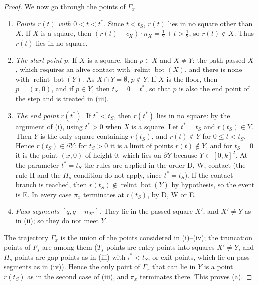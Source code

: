 \documentclass[11pt]{amsart}
\newcommand{\relint}{\operatorname{relint}}
\newcommand{\Bot}{\operatorname{bot}}
\newcommand{\Fs}{F_{s}}
\theoremstyle{definition}
\theoremstyle{remark}
\numberwithin{equation}{section}
\begin{document}
\begin{proof}
We now go through the points of $\Gamma_x$.
\begin{enumerate}[label=(\roman*)]
\item \emph{Points $r(t)$ with $0<t<t^*$.} Since $t<t_S$, $r(t)$ lies in no square other than $X$. If $X$ is a square, then $(r(t)-c_X)\cdot n_X=\frac12+t>\frac12$, so $r(t)\notin X$. Thus $r(t)$ lies in no square.
\item \emph{The start point $p$.} If $X$ is a square, then $p\in X$ and $X\ne Y$: the path passed $X$, which requires an alive contact with $\relint\Bot(X)$, and there is none with $\relint\Bot(Y)$. As $X\cap Y=\emptyset$, $p\notin Y$. If $X$ is the floor, then $p=(x,0)$, and if $p\in Y$, then $t_S=0=t^*$, so that $p$ is also the end point of the step and is treated in (iii).
\item \emph{The end point $r(t^*)$.} If $t^*<t_S$, then $r(t^*)$ lies in no square: by the argument of (i), using $t^*>0$ when $X$ is a square. Let $t^*=t_S$ and $r(t_S)\in Y$. Then $Y$ is the only square containing $r(t_S)$, and $r(t)\notin Y$ for $0\le t<t_S$. Hence $r(t_S)\in\partial Y$: for $t_S>0$ it is a limit of points $r(t)\notin Y$, and for $t_S=0$ it is the point $(x,0)$ of height $0$, which lies on $\partial Y$ because $Y\subset[0,k]^2$. At the parameter $t^*=t_S$ the rules are applied in the order D, W, contact (the rule H and the $H_s$ condition do not apply, since $t^*=t_S$). If the contact branch is reached, then $r(t_S)\notin\relint\Bot(Y)$ by hypothesis, so the event is E. In every case $\pi_x$ terminates at $r(t_S)$, by D, W or E.
\item \emph{Pass segments $[q,q+n_{X'}]$.} They lie in the passed square $X'$, and $X'\ne Y$ as in (ii); so they do not meet $Y$.
\end{enumerate}
The trajectory $\Gamma_x$ is the union of the points considered in (i)--(iv); the truncation points of $\Fs$ are among them ($T_s$ points are entry points into squares $X'\ne Y$, and $H_s$ points are gap points as in (iii) with $t^*<t_S$, or exit points, which lie on pass segments as in (iv)). Hence the only point of $\Gamma_x$ that can lie in $Y$ is a point $r(t_S)$ as in the second case of (iii), and $\pi_x$ terminates there. This proves (a).


\end{proof}
\end{document}
